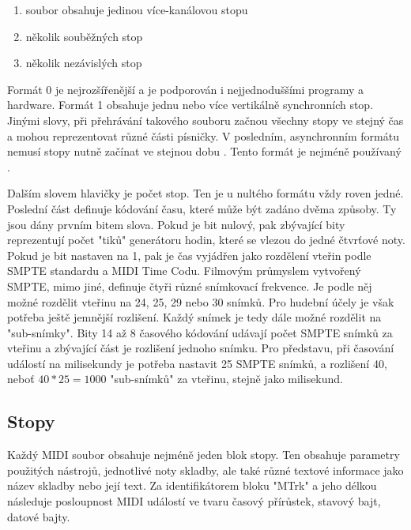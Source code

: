 \begin{enumerate}\addtocounter{enumi}{-1}
    \item soubor obsahuje jedinou více-kanálovou stopu
    \item několik souběžných stop
    \item několik nezávislých stop
\end{enumerate}

Formát 0 je nejrozšířenější a je podporován i nejjednoduššími programy 
a hardware.
\cite{Back_SMF_Specif}
Formát 1 obsahuje jednu nebo více vertikálně synchronních stop.
Jinými slovy, při přehrávání takového souboru 
začnou všechny stopy ve stejný čas 
a mohou reprezentovat různé části písničky.
V posledním, asynchronním formátu nemusí stopy nutně začínat ve stejnou dobu
\cite{Neznamy_aboutMIDIFiles}.
Tento formát je nejméně používaný
\cite{MIDI_tutorials}.
\par

Dalším slovem hlavičky je počet stop.
Ten je u nultého formátu vždy roven jedné.
Poslední část definuje kódování času, 
které může být zadáno dvěma způsoby.
Ty jsou dány prvním bitem slova.
Pokud je bit nulový, 
pak zbývající bity reprezentují počet "tiků" generátoru hodin, 
které se vlezou do jedné čtvrťové noty.
Pokud je bit nastaven na 1, 
pak je čas vyjádřen jako rozdělení vteřin podle SMPTE standardu
a MIDI Time Codu.
\cite{Back_SMF_Specif}
Filmovým průmyslem vytvořený SMPTE, mimo jiné, 
definuje čtyři různé snímkovací frekvence.
Je podle něj možné rozdělit vteřinu na 24, 25, 29 nebo 30 snímků.
Pro hudební účely je však potřeba ještě jemnější rozlišení.
Každý snímek je tedy dále možné rozdělit na "sub-snímky".
\cite{Neznamy_aboutMIDIFiles}
Bity 14 až 8 časového kódování udávají počet SMPTE snímků za vteřinu 
a zbývající část je rozlišení jednoho snímku.
Pro představu,
při časování událostí na milisekundy je potřeba nastavit 25 SMPTE snímků,
a rozlišení 40, neboť $ 40 * 25 = 1000 $ "sub-snímků" za vteřinu, 
stejně jako milisekund. 
\cite{Back_SMF_Specif}
\par

\subsection{Stopy}
Každý MIDI soubor obsahuje nejméně jeden blok stopy.
Ten obsahuje parametry použitých nástrojů, jednotlivé noty skladby, 
ale také různé textové informace jako název skladby nebo její text.
Za identifikátorem bloku "MTrk" a jeho délkou 
následuje posloupnost MIDI událostí
ve tvaru časový přírůstek, stavový bajt, datové bajty.
\cite{Back_SMF_Specif}
\par


